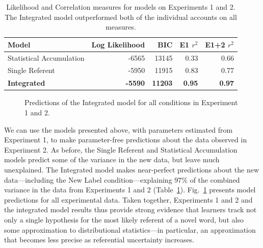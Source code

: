 \documentclass[man,floatsintext]{apa6}
\begin{document}
\begin{table}[tb]
\begin{center}
\begin{tabular}{lrrrr}
  Model & Log Likelihood & BIC & E1 $r^{2}$ & E1+2 $r^{2}$ \\ 
  \hline
  Statistical Accumulation & -6565 & 13145 & 0.33 & 0.66 \\ 
  Single Referent & -5950 & 11915 & 0.83 & 0.77 \\ 
  \textbf{Integrated} & \textbf{-5590} & \textbf{11203} & \textbf{0.95} & \textbf{0.97} \\ 
  \hline
\end{tabular}
\end{center}
\caption{\label{tab:model}Likelihood and Correlation measures for models on Experiments 1 and 2. The Integrated model outperformed both of the individual accounts on all measures.}
\end{table}

 \begin{figure}[tb]
	\caption{\label{fig:model_fit} Predictions of the Integrated model for all conditions in Experiment 1 and 2. }
\end{figure}

We can use the models presented above, with parameters estimated from Experiment 1, to make parameter-free predictions about the data observed in Experiment 2. As before, the Single Referent and Statistical Accumulation models predict some of the variance in the new data, but leave much unexplained. The Integrated model makes near-perfect predictions about the new data---including the New Label condition---explaining 97\% of the combined variance in the data from Experiments 1 and 2 (Table~\ref{tab:model}). Fig.~\ref{fig:model_fit} presents model predictions for all experimental data. Taken together, Experiments 1 and 2 and the integrated model results thus provide strong evidence that learners track not only a single hypothesis for the most likely referent of a novel word, but also some approximation to distributional statistics---in particular, an approximation that becomes less precise as referential uncertainty increases.
\end{document}
